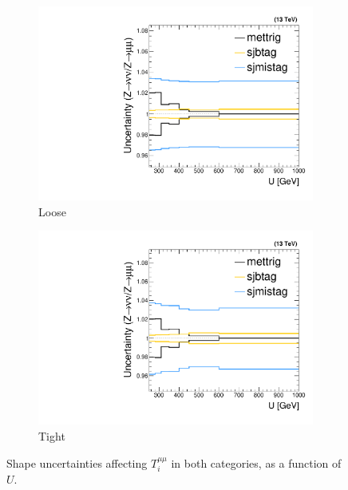 \begin{figure}[!ht]
    \begin{center}
        \begin{subfigure}[t]{0.49\textwidth}
            \includegraphics[width=\textwidth]{figures/monotop/uncertainties/variations_dimuon_loose.pdf}
            \caption{Loose}
        \end{subfigure}
        \begin{subfigure}[t]{0.49\textwidth}
            \includegraphics[width=\textwidth]{figures/monotop/uncertainties/variations_dimuon.pdf}
            \caption{Tight}
        \end{subfigure}
        \caption{Shape uncertainties affecting $T_i^{\mu\mu}$ in both categories, as a function of $U$.}
        \label{fig:mt:zmm_uncs}
    \end{center}
\end{figure}



